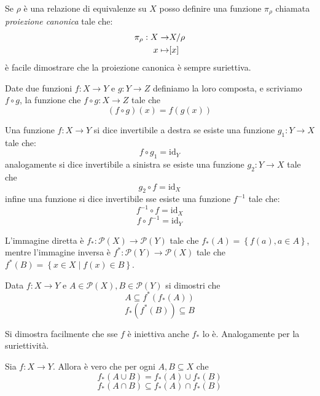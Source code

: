 \documentclass[11pt]{scrartcl}
\newcommand{\parti}{\mathcal{P}}
\begin{document}
	\begin{definition}
		Se $\rho$ è una relazione di equivalenze su $X$ posso definire una funzione $\pi_\rho$ chiamata \textit{proiezione canonica} tale che:
		\begin{align}
			\notag \pi_\rho:  X\to& X/\rho \\ 
			\notag        x\mapsto& [x] 
		\end{align}
		è facile dimostrare che la proiezione canonica è sempre suriettiva.
	\end{definition}
	
	\begin{definition}
		Date due funzioni $f:X\to Y$ e $g:Y\to Z$ definiamo la loro composta, e scriviamo $f\circ g$, la funzione che $f\circ g:X\to Z$ tale che 
		$$(f\circ g)(x)=f(g(x))$$
	\end{definition}
	
	\begin{definition}
		Una funzione $f:X\to Y$ si dice invertibile a destra se esiste una funzione $g_1:Y\to X$ tale che:
		$$f\circ g_1 = \text{id}_Y$$
		analogamente si dice invertibile a sinistra se esiste una funzione $g_2:Y\to X$ tale che
		$$g_2\circ f = \text{id}_X$$
		infine una funzione si dice invertibile sse esiste una funzione $f^{-1}$ tale che:
		$$f^{-1}\circ f = \text{id}_X$$ 
		$$f \circ f^{-1}= \text{id}_Y$$
	\end{definition}
	
	\begin{definition}
		L'immagine diretta è $f_*:\parti(X)\to \parti(Y)$ tale che $f_*(A)=\left\{ f(a),a\in A\right\}$, mentre l'immagine inversa è $f^*:\parti(Y)\to\parti(X)$ tale che $f^*(B)=\left\{x\in X\mid f(x)\in B\right\}$.
	\end{definition}
	
	\begin{exercise}
		Data $f:X\to Y$ e $A\in\parti(X),B\in\parti(Y)$ si dimostri che
		$$A\subseteq f^*(f_*(A))$$
		$$f_*(f^*(B))\subseteq B$$
	\end{exercise}
	
	\begin{exercise}
		Si dimostra facilmente che sse $f$ è iniettiva anche $f_*$ lo è. Analogamente per la suriettività.
	\end{exercise}
	
	\begin{lemma}
		Sia $f:X\to Y$. Allora è vero che per ogni $A,B\subseteq X$ che
		$$f_*(A\cup B)=f_*(A)\cup f_*(B)$$
		$$f_*(A\cap B)\subseteq f_*(A)\cap f_*(B)$$
	\end{lemma}
	
\end{document}
